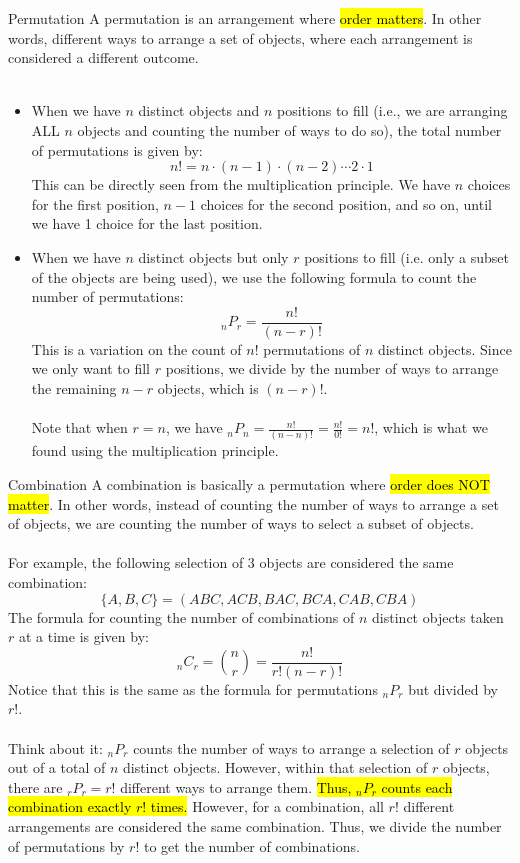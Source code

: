 ﻿\documentclass[12pt]{article}
\begin{document}
\begin{definition}{Permutation}
    A permutation is an arrangement where \hl{order matters}. In other words, different ways to arrange a set of objects, where each arrangement is considered a different outcome.\\\\
    \begin{itemize}
        \item When we have $n$ distinct objects and $n$ positions to fill (i.e., we are arranging ALL $n$ objects and counting the number of ways to do so), the total number of permutations is given by:
        \[n! = n \cdot (n-1) \cdot (n-2) \cdots 2 \cdot 1\]
        This can be directly seen from the multiplication principle. We have $n$ choices for the first position, $n-1$ choices for the second position, and so on, until we have 1 choice for the last position.
        \item When we have $n$ distinct objects but only $r$ positions to fill (i.e. only a subset of the objects are being used), we use the following formula to count the number of permutations:
        \[_nP_r = \frac{n!}{(n-r)!}\]
        This is a variation on the count of $n!$ permutations of $n$ distinct objects. Since we only want to fill $r$ positions, we divide by the number of ways to arrange the remaining $n-r$ objects, which is $(n-r)!$.\\\\
        Note that when $r=n$, we have $_nP_n = \frac{n!}{(n-n)!} = \frac{n!}{0!} = n!$, which is what we found using the multiplication principle.
    \end{itemize}
\end{definition}

\begin{definition}{Combination}
    A combination is basically a permutation where \hl{order does NOT matter}. In other words, instead of counting the number of ways to arrange a set of objects, we are counting the number of ways to select a subset of objects.\\\\
    For example, the following selection of 3 objects are considered the same combination:
    \[\{A, B, C\} = (ABC, ACB, BAC, BCA, CAB, CBA)\]
    The formula for counting the number of combinations of $n$ distinct objects taken $r$ at a time is given by:
    \[_nC_r =\binom{n}{r} = \frac{n!}{r!(n-r)!}\]
    Notice that this is the same as the formula for permutations $_nP_r$ but divided by $r!$.\\\\
   Think about it: ${}_nP_r$ counts the number of ways to arrange a selection of $r$ objects out of a total of $n$ distinct objects. However, within that selection of $r$ objects, there are ${}_rP_r = r!$ different ways to arrange them. \hl{Thus, ${}_nP_r$ counts each combination exactly $r!$ times.} However, for a combination, all $r!$ different arrangements are considered the same combination. Thus, we divide the number of permutations by $r!$ to get the number of combinations.
\end{definition}
\end{document}
